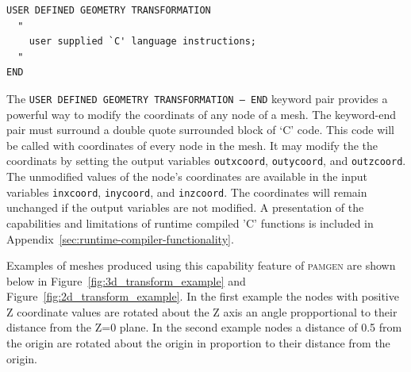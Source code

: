 {\ttfamily \small \begin{verbatim}
USER DEFINED GEOMETRY TRANSFORMATION 
  "
    user supplied `C' language instructions;
  "
END
\end{verbatim}
} 

The \texttt{USER DEFINED GEOMETRY TRANSFORMATION -- END} keyword pair provides
a powerful way to modify the coordinats of any node of a mesh. The keyword-end
pair must surround a double quote surrounded block of `C' code. This code will be called with coordinates of every node in the mesh. It may modify the the coordinats by setting the output variables \texttt{outxcoord}, \texttt{outycoord}, and \texttt{outzcoord}. The unmodified values of the node's coordinates are available in the input variables \texttt{inxcoord}, \texttt{inycoord}, and \texttt{inzcoord}.  The coordinates will remain unchanged if the output variables are not modified.  A presentation of the capabilities and
limitations of runtime compiled 'C' functions is included in
Appendix~\ref{sec:runtime-compiler-functionality}.

Examples of meshes produced using this capability feature of \textsc{pamgen} are shown below in Figure~\ref{fig:3d_transform_example} and Figure~\ref{fig:2d_transform_example}. In the first example the nodes with positive Z coordinate values are rotated about the Z axis an angle propportional to their distance from the Z=0 plane. In the second example nodes a distance of 0.5 from the origin are rotated about the origin in proportion to their distance from the origin.


